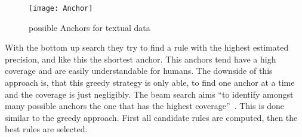 \begin{figure*}[h]
    \center
    \texttt{[image: Anchor]}
    \caption{possible Anchors for textual data~\cite{Ribeiro.2018}}
    \label{fig:Anchor}
\end{figure*}
\par
With the bottom up search they try to find a rule with the highest estimated precision, and like this the shortest anchor. This anchors tend have a high coverage and are easily understandable for humans. 
The downside of this approach is, that this greedy strategy is only able, to find one anchor at a time and the coverage is just negligibly.
The beam search aims “to identify amongst many possible anchors the one that has the highest coverage”~\cite[5]{Ribeiro.2018}. This is done similar to the greedy approach. First all candidate rules are computed, then the best rules are selected.

